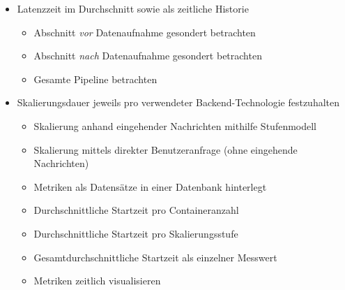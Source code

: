 \begin{itemize}
  \item Latenzzeit im Durchschnitt sowie als zeitliche Historie
  \begin{itemize}
    \item Abschnitt \emph{vor} Datenaufnahme gesondert betrachten
    \item Abschnitt \emph{nach} Datenaufnahme gesondert betrachten
    \item Gesamte Pipeline betrachten
  \end{itemize}
  \item Skalierungsdauer jeweils pro verwendeter Backend-Technologie festzuhalten
  \begin{itemize}
    \item Skalierung anhand eingehender Nachrichten mithilfe Stufenmodell
    \item Skalierung mittels direkter Benutzeranfrage (ohne eingehende Nachrichten)
    \item Metriken als Datensätze in einer Datenbank hinterlegt
    \item Durchschnittliche Startzeit pro Containeranzahl 
    \item Durchschnittliche Startzeit pro Skalierungsstufe 
    \item Gesamtdurchschnittliche Startzeit als einzelner Messwert
    \item Metriken zeitlich visualisieren
  \end{itemize}
\end{itemize}